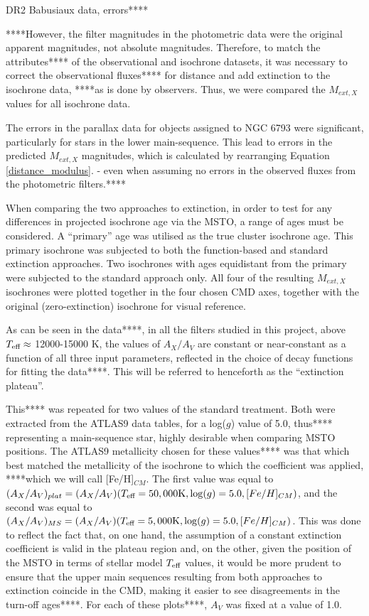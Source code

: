 \documentclass[12pt, a4paper]{report}
\begin{document}
DR2 Babusiaux data, errors****

****However, the filter magnitudes in the photometric data were the original apparent magnitudes, not absolute magnitudes. Therefore, to match the attributes**** of the observational and isochrone datasets, it was necessary to correct the observational fluxes**** for distance and add extinction to the isochrone data, ****as is done by observers. Thus, we were compared the $M_{ext,X}$ values for all isochrone data.

The errors in the parallax data for objects assigned to NGC 6793 were significant, particularly for stars in the lower main-sequence. This lead to errors in the predicted $M_{ext,X}$ magnitudes, which is calculated by rearranging Equation \ref{distance_modulus}. - even when assuming no errors in the observed fluxes from the photometric filters.****


When comparing the two approaches to extinction, in order to test for any differences in projected isochrone age via the MSTO, a range of ages must be considered. A ``primary'' age was utilised as the true cluster isochrone age. This primary isochrone was subjected to both the function-based and standard extinction approaches. Two isochrones with ages equidistant from the primary were subjected to the standard approach only. All four of the resulting $M_{ext,X}$ isochrones were plotted together in the four chosen CMD axes, together with the original (zero-extinction) isochrone for visual reference.

As can be seen in the data****, in all the filters studied in this project, above $T_{\textnormal{eff}} \approx$ 12000-15000 K, the values of $A_{X}/A_{V}$ are constant or near-constant as a function of all three input parameters, reflected in the choice of decay functions for fitting the data****. This will be referred to henceforth as the ``extinction plateau''.

This**** was repeated for two values of the standard treatment. Both were extracted from the ATLAS9 data tables, for a log($g$) value of 5.0, thus**** representing a main-sequence star, highly desirable when comparing MSTO positions. The ATLAS9 metallicity chosen for these values**** was that which best matched the metallicity of the isochrone to which the coefficient was applied, ****which we will call [Fe/H]$_{CM}$. The first value was equal to $(A_{X}/A_{V})_{plat} = (A_{X}/A_{V})(T_{\textnormal{eff}} = 50,000\textnormal{K},\log(g) = 5.0,[Fe/H]_{CM})$, and the second was equal to  $(A_{X}/A_{V})_{MS} = (A_{X}/A_{V})(T_{\textnormal{eff}} = 5,000\textnormal{K},\log(g) = 5.0,[Fe/H]_{CM})$. This was done to reflect the fact that, on one hand, the assumption of a constant extinction coefficient is valid in the plateau region and, on the other, given the position of the MSTO in terms of stellar model $T_{\textnormal{eff}}$ values, it would be more prudent to ensure that the upper main sequences resulting from both approaches to extinction coincide in the CMD, making it easier to see disagreements in the turn-off ages****. For each of these plots****, $A_{V}$ was fixed at a value of 1.0.
\end{document}
